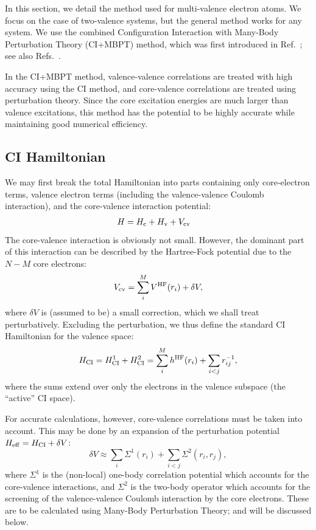 \documentclass[10pt,twocolumn,a4paper]{article}%
\newcommand{\be}{\begin{equation}}
\newcommand{\ee}{\end{equation}}
\begin{document}
In this section, we detail the method used for multi-valence electron atoms. We focus on the case of two-valence systems, but the general method works for any system.
We use the combined Configuration Interaction with Many-Body Perturbation Theory (CI+MBPT) method, which was first introduced in Ref.~\cite{DzubaCIMBPT1996};
see also Refs.~\cite{DzubaCIMBPT1996,DzubaVN-M2005,AMBiT2018,Berengut2006,Kozlov2022,Kozlov2015}.

In the CI+MBPT method, valence-valence correlations are treated with high accuracy using the CI method, and core-valence correlations are treated using perturbation theory.
Since the core excitation energies are much larger than valence excitations, this method has the potential to be highly accurate while maintaining good numerical efficiency.

\subsection{CI Hamiltonian}

We may first break the total Hamiltonian into parts containing only core-electron terms, valence electron terms (including the valence-valence Coulomb interaction), and the core-valence interaction potential:
\begin{align}
H &= H_{\rm c} + H_{\rm v} + V_{\rm cv}
\end{align}
The core-valence interaction is obviously not small.
However, the dominant part of this interaction can be described by the Hartree-Fock potential due to the $N-M$ core electrons:
\be
V_{\rm cv} = \sum_i^M V^{\rm HF}(r_i) + \delta V,
\ee
where $\delta V$ is (assumed to be) a small correction, which we shall treat perturbatively.
Excluding the perturbation, we thus define the standard CI Hamiltonian for the valence space:
\be\label{eq:Hci}
    H_{\rm CI} = H_{\rm CI}^1 + H_{\rm CI}^2 = 
    \sum_i^M h^{\rm HF}(r_i)
+\sum_{i<j}r^{-1}_{ij},
\ee
where the sums extend over only the electrons in the valence subspace (the ``active'' CI space).

For accurate calculations, however, core-valence correlations must be taken into account. 
This may be done by an expansion of the perturbation potential $H_{\rm eff} = H_{\rm CI} + \delta V$:
\be\label{eq:Hci-dV}
    \delta V \approx \sum_i \Sigma^1(r_i) +\sum_{i<j}\Sigma^2(r_i,r_j),
\ee
where $\Sigma^1$ is the (non-local) one-body correlation potential which accounts for the core-valence interactions, and $\Sigma^2$ is the two-body operator which accounts for the screening of the valence-valence Coulomb interaction by the core electrons.
These are to be calculated using Many-Body Perturbation Theory; and will be discussed below.
\end{document}
